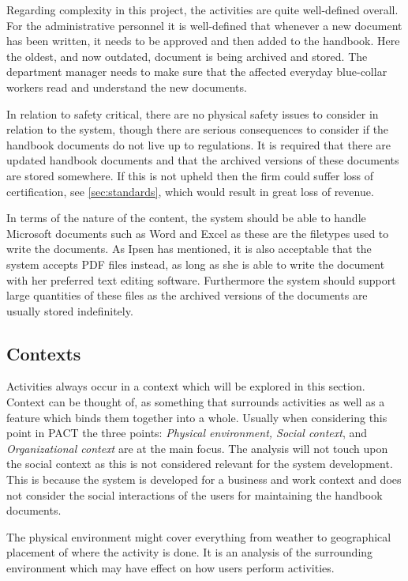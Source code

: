 Regarding complexity in this project, the activities are quite well-defined overall.
For the administrative personnel it is well-defined that whenever a new document has been written, it needs to be approved and then added to the handbook.
Here the oldest, and now outdated, document is being archived and stored.
The department manager needs to make sure that the affected everyday blue-collar workers read and understand the new documents.

In relation to safety critical, there are no physical safety issues to consider in relation to the system, though there are serious consequences to consider if the handbook documents do not live up to regulations.
It is required that there are updated handbook documents and that the archived versions of these documents are stored somewhere.
If this is not upheld then the firm could suffer loss of certification, see \cref{sec:standards}, which would result in great loss of revenue.

In terms of the nature of the content, the system should be able to handle Microsoft documents such as Word and Excel as these are the filetypes used to write the documents.
As Ipsen has mentioned, it is also acceptable that the system accepts PDF files instead, as long as she is able to write the document with her preferred text editing software.
Furthermore the system should support large quantities of these files as the archived versions of the documents are usually stored indefinitely.

\subsection{Contexts}
Activities always occur in a context which will be explored in this section.
Context can be thought of, as something that surrounds activities as well as a feature which binds them together into a whole.
Usually when considering this point in PACT the three points: \textit{Physical environment, Social context}, and \textit{Organizational context} are at the main focus.
The analysis will not touch upon the social context as this is not considered relevant for the system development.
This is because the system is developed for a business and work context and does not consider the social interactions of the users for maintaining the handbook documents.

The physical environment might cover everything from weather to geographical placement of where the activity is done.
It is an analysis of the surrounding environment which may have effect on how users perform activities.


